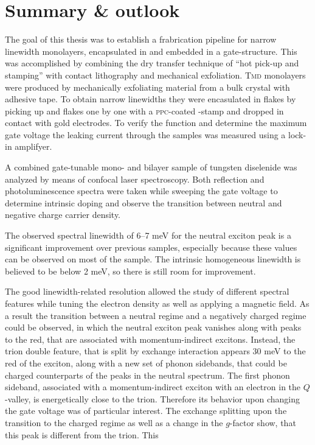 \chapter{Summary \& outlook}

The goal of this thesis was to establish a frabrication pipeline for narrow linewidth \tmdg monolayers, encapsulated in \hbng and embedded in a gate-structure. This was accomplished by combining the dry transfer technique of ``hot pick-up and stamping'' \cite{pizzocchero_hot_2016, tien_study_2016} with contact lithography and mechanical exfoliation. \textsc{Tmd} monolayers were produced by mechanically exfoliating material from a bulk crystal with adhesive tape. To obtain narrow linewidths they were encasulated in \hbng flakes by picking up \hbng and \tmdg flakes one by one with a \textsc{ppc}-coated \pdms-stamp and dropped in contact with gold electrodes. To verify the function and determine the maximum gate voltage the leaking current through the samples was measured using a lock-in amplifyer.

A combined gate-tunable mono- and bilayer sample of tungsten diselenide was analyzed by means of confocal laser spectroscopy. Both reflection and photoluminescence spectra were taken while sweeping the gate voltage to determine intrinsic doping and observe the transition between neutral and negative charge carrier density.

The observed spectral linewidth of 6--7 meV for the neutral exciton peak is a significant improvement over previous samples, especially because these values can be observed on most of the sample. The intrinsic homogeneous linewidth is believed to be below 2 meV, so there is still room for improvement.

The good linewidth-related resolution allowed the study of different spectral features while tuning the electron density as well as applying a magnetic field. As a result the transition between a neutral regime and a negatively charged regime could be observed, in which the neutral exciton peak vanishes along with peaks to the red, that are associated with momentum-indirect excitons. Instead, the trion double feature, that is split by exchange interaction appears 30 meV to the red of the exciton, along with a new set of phonon sidebands, that could be charged counterparts of the peaks in the neutral spectrum. The first phonon sideband, associated with a momentum-indirect exciton with an electron in the $Q$-valley, is energetically close to the trion. Therefore its behavior upon changing the gate voltage was of particular interest. The exchange splitting upon the transition to the charged regime as well as a change in the $g$-factor show, that this peak is different from the trion. This 


